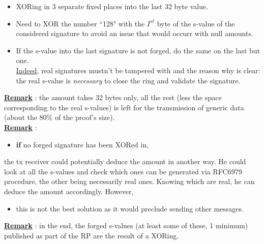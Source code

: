 \documentclass[10.5pt,compress]{beamer}
\begin{document}
\begin{frame}[allowframebreaks]
\begin{enumerate}
\begin{enumerate}
            \begin{itemize}
                \item XORing in 3 separate fixed places into the last 32 byte value.
                \item Need to XOR the number ``128" with the $I^{st}$ byte of the s-value of the considered signature to avoid an issue that would occurr with null amounts.
                \item If the s-value into the last signature is not forged, do the same on the last but one.\\ \underline{Indeed}, real signatures mustn't be tampered with and the reason why is clear: the real s-value is \textit{necessary} to close the ring and validate the signature.
            \end{itemize}
        \end{enumerate}
        \framebreak
        \textbf{\underline{Remark}} : the amount takes 32 bytes only, all the rest (less the space corresponding to the real s-values) is left for the transmission of generic data (about the 80\% of the proof's size).\\ %
        \textbf{\underline{Remark}} : 
        \begin{itemize}
            \item \textbf{if} no forged signature has been XORed in,
        \end{itemize}
        the tx receiver could potentially deduce the amount in another way. He could look at all the s-values and check which ones can be generated via RFC6979 procedure, the other being necessarily real ones. Knowing which are real, he can deduce the amount accordingly.
        However,
        \begin{itemize}
            \item this is not the best solution as it would preclude sending other messages.
        \end{itemize}
        \textbf{\underline{Remark}} : in the end, the forged s-values (at least some of these, 1 minimum) published as part of the RP are the result of a XORing.

\end{enumerate}
\end{frame}
\end{document}
